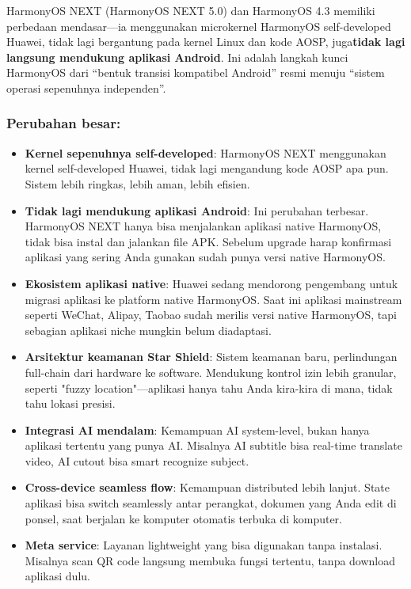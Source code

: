 HarmonyOS NEXT (HarmonyOS NEXT 5.0) dan HarmonyOS 4.3 memiliki perbedaan mendasar—ia menggunakan microkernel HarmonyOS self-developed Huawei, tidak lagi bergantung pada kernel Linux dan kode AOSP, juga\textbf{tidak lagi langsung mendukung aplikasi Android}. Ini adalah langkah kunci HarmonyOS dari “bentuk transisi kompatibel Android” resmi menuju “sistem operasi sepenuhnya independen”.

\subsubsection*{Perubahan besar:}

\begin{itemize}
  \item \textbf{Kernel sepenuhnya self-developed}: HarmonyOS NEXT menggunakan kernel self-developed Huawei, tidak lagi mengandung kode AOSP apa pun. Sistem lebih ringkas, lebih aman, lebih efisien.
  \item \textbf{Tidak lagi mendukung aplikasi Android}: Ini perubahan terbesar. HarmonyOS NEXT hanya bisa menjalankan aplikasi native HarmonyOS, tidak bisa instal dan jalankan file APK. Sebelum upgrade harap konfirmasi aplikasi yang sering Anda gunakan sudah punya versi native HarmonyOS.
  \item \textbf{Ekosistem aplikasi native}: Huawei sedang mendorong pengembang untuk migrasi aplikasi ke platform native HarmonyOS. Saat ini aplikasi mainstream seperti WeChat, Alipay, Taobao sudah merilis versi native HarmonyOS, tapi sebagian aplikasi niche mungkin belum diadaptasi.
  \item \textbf{Arsitektur keamanan Star Shield}: Sistem keamanan baru, perlindungan full-chain dari hardware ke software. Mendukung kontrol izin lebih granular, seperti "fuzzy location"—aplikasi hanya tahu Anda kira-kira di mana, tidak tahu lokasi presisi.
  \item \textbf{Integrasi AI mendalam}: Kemampuan AI system-level, bukan hanya aplikasi tertentu yang punya AI. Misalnya AI subtitle bisa real-time translate video, AI cutout bisa smart recognize subject.
  \item \textbf{Cross-device seamless flow}: Kemampuan distributed lebih lanjut. State aplikasi bisa switch seamlessly antar perangkat, dokumen yang Anda edit di ponsel, saat berjalan ke komputer otomatis terbuka di komputer.
  \item \textbf{Meta service}: Layanan lightweight yang bisa digunakan tanpa instalasi. Misalnya scan QR code langsung membuka fungsi tertentu, tanpa download aplikasi dulu.
\end{itemize}

